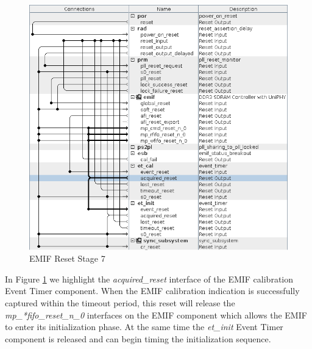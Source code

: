 \documentclass{article}
\begin{document}
\begin{flushleft}
\begin{figure}[H]
\centering
\includegraphics[scale=0.675]{emif_reset_stage_7}
\caption{EMIF Reset Stage 7}
\label{fig:emif_reset_stage_7}
\end{figure}

In Figure \ref{fig:emif_reset_stage_7} we highlight the \emph{acquired\_reset} interface of the EMIF calibration Event Timer component.  When the EMIF calibration indication is successfully captured within the timeout period, this reset will release the \emph{mp\_*fifo\_reset\_n\_0} interfaces on the EMIF component which allows the EMIF to enter its initialization phase.  At the same time the \emph{et\_init} Event Timer component is released and can begin timing the initialization sequence.


\end{flushleft}
\end{document}
